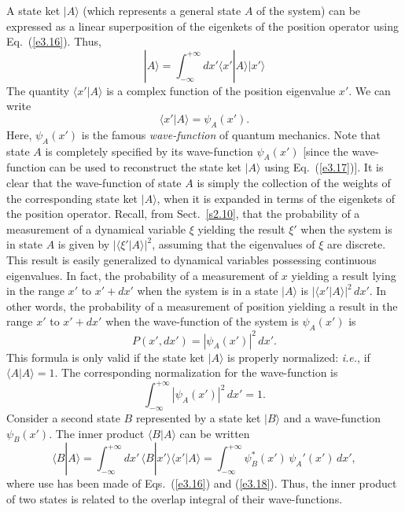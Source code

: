 A state ket $|A\rangle$ (which represents a general  state $A$ of the system)
can be expressed as a linear superposition of the eigenkets of the position
operator using Eq.~(\ref{e3.16}). Thus,
\begin{equation}\label{e3.17}
|A\rangle = \int_{-\infty}^{+\infty} dx' \langle x'|A\rangle |x'\rangle
\end{equation}
The quantity $\langle x'|A\rangle$ is a complex function of the position eigenvalue
$x'$. We can write
\begin{equation}\label{e3.18}
\langle x'|A\rangle = \psi_A(x').
\end{equation}
Here, $\psi_A(x')$ is the famous {\em wave-function} of quantum mechanics. 
Note that state $A$ is completely specified by its wave-function $\psi_A(x')$
[since the wave-function can be used to reconstruct the state ket $|A\rangle$
using Eq.~(\ref{e3.17})].
It is clear that the wave-function of state $A$ is simply the collection
of the weights of the corresponding state ket $|A\rangle$,
when it is expanded in terms of the eigenkets of the
position operator. Recall, from Sect.~\ref{s2.10}, that the probability of
a measurement of a dynamical variable $\xi$ yielding the result $\xi'$ 
when the system is in state $A$ is given by
$|\langle \xi'|A\rangle|^2$, assuming that
the
eigenvalues of $\xi$ are discrete. This result is easily generalized to dynamical
variables possessing continuous eigenvalues. In fact, the probability of
a measurement of $x$ yielding a result lying in the range $x'$ to $x'+dx'$
when the system is in a state $|A\rangle$ is $|\langle x'|A\rangle|^2\,dx'$. 
In other words, the probability of a measurement of position yielding a
result in the range $x'$ to $x'+dx'$ when the wave-function of the system is
$\psi_A(x')$ is
\begin{equation}\label{e3.19}
P(x', dx') = |\psi_A(x')|^2\, dx'.
\end{equation}
This formula is only valid if the state ket $|A\rangle$ is properly normalized:
{\em i.e.}, if $\langle A|A\rangle = 1$. The corresponding normalization for
the wave-function is
\begin{equation}\label{e3.20}
\int_{-\infty}^{+\infty} |\psi_A(x')|^2\,dx'= 1.
\end{equation}
Consider a second state $B$ represented by a state ket $|B\rangle$ and
a wave-function $\psi_B(x')$. The inner product $\langle B| A\rangle$ 
can be written
\begin{equation}
\langle B| A\rangle = \int_{-\infty}^{+\infty} dx'\,\langle B| x'\rangle
\langle x' | A \rangle 
 = \int_{-\infty}^{+\infty} \psi_B^\ast (x') \,\psi_A'(x')\,dx',
\end{equation}
where use has been made of Eqs.~(\ref{e3.16}) and (\ref{e3.18}). Thus, the inner product of two states is
related to the overlap integral of their wave-functions. 

